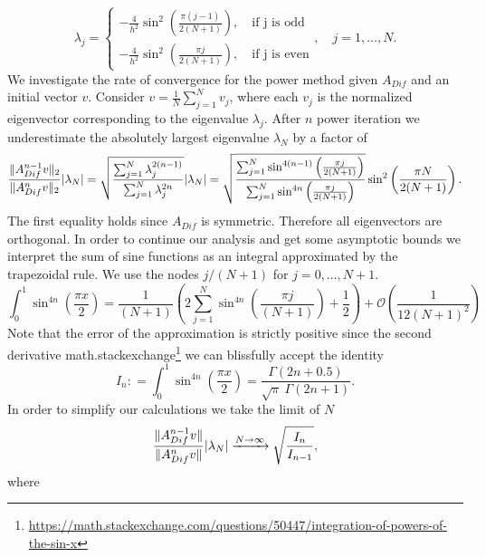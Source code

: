 \documentclass{scrartcl}
\newcommand{\defneq}{\mathrel{\mathop:}=}
\DeclarePairedDelimiter\abs{\lvert}{\rvert}%
\DeclarePairedDelimiter\norm{\lVert}{\rVert}%
\begin{document}
\[
\lambda_j =
\begin{cases*}
-\frac{4}{h^2} \sin^2\left(\frac{\pi (j-1)}{2(N+1)}\right),\quad\text{if j is odd}\\
-\frac{4}{h^2} \sin^2\left(\frac{\pi j}{2(N+1)}\right),\quad\text{if j is even}
\end{cases*} 
,\quad j=1,\dots, N.
\]
We investigate the rate of convergence for the power method given $A_{Dif}$ and an initial vector $v$. Consider $v=\frac{1}{N}\sum_{j=1}^N v_{j}$, where each $v_j$ is the normalized eigenvector corresponding to the eigenvalue $\lambda_j$.
After $n$ power iteration we underestimate the absolutely largest eigenvalue $\lambda_N$ by a factor of
\begin{align*}
\frac{\norm{A_{Dif}^{n-1}v}_2}{\norm{A_{Dif}^nv}_2}\abs{\lambda_N} = 
\sqrt{\frac{\sum_{j=1}^{N}{\lambda_j^{2(n-1)}}}{\sum_{j=1}^{N}{\lambda_j^{2n}}}}\abs{\lambda_N} = 
\sqrt{\frac{\sum_{j=1}^{N}\sin^{4(n-1)}
		\left(\frac{\pi j}{2(N+1)}\right)}{\sum_{j=1}^{N}\sin^{4n}
		\left(\frac{\pi j}{2(N+1)}\right)}}\sin^2\left(\frac{\pi N}{2(N+1)}\right).
\end{align*}
The first equality holds since $A_{Dif}$ is symmetric. Therefore all eigenvectors are orthogonal. In order to continue our analysis and get some asymptotic bounds we interpret the sum of sine functions as an integral approximated by the trapezoidal rule. We use the nodes $j/(N+1)$ for $j=0,\dots,{N+1}$.
\[
\int_{0}^{1}{\sin^{4n}\left(\frac{\pi x}{2}\right)} =
\frac{1}{(N+1)}\left(2\sum_{j=1}^{N}\sin^{4n}\left(\frac{\pi j}{(N+1)}\right) + \frac{1}{2}\right)
+ \mathcal{O}\left(\frac{1}{12(N+1)^2}\right)
\]
Note that the error of the approximation is strictly positive since the second derivative  math.stackexchange\footnote{\url{https://math.stackexchange.com/questions/50447/integration-of-powers-of-the-sin-x}} we can blissfully accept the identity
\[I_n \defneq \int_{0}^{1}{\sin^{4n}\left(\frac{\pi x}{2}\right)} = \frac{\Gamma(2n+0.5)}{\sqrt{\pi}\ \Gamma(2n+1)}. \]
In order to simplify our calculations we take the limit of $N$
\[ 
\frac{\norm{A_{Dif}^{n-1}v}}{\norm{A_{Dif}^{n}v}}\abs{\lambda_N} \xrightarrow[]{N\to\infty}
\sqrt{\frac{I_n}{I_{n-1}}}, 
\]
where
\end{document}
